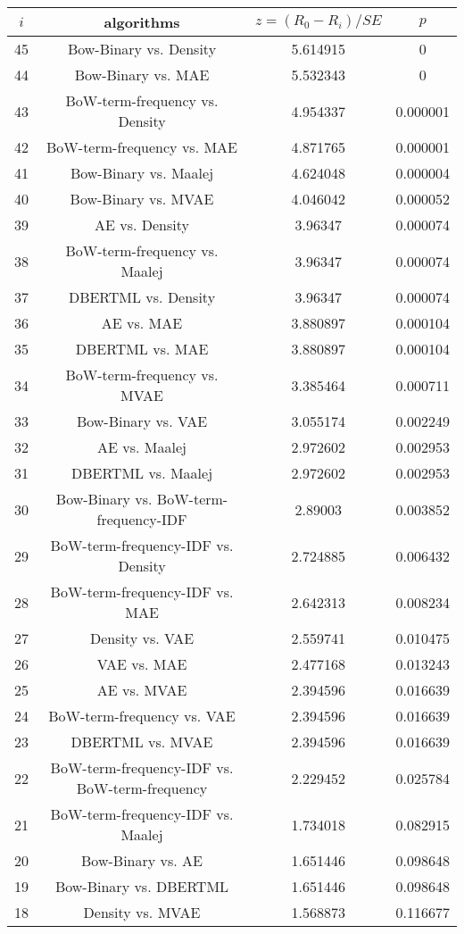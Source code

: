 \documentclass[a4paper,10pt]{article}
\begin{document}
\begin{landscape}
\begin{table}[!htp]
\centering\scriptsize
\begin{tabular}{cccc}
$i$&algorithms&$z=(R_0 - R_i)/SE$&$p$\\
\hline45&Bow-Binary vs. Density&5.614915&0\\
44&Bow-Binary vs. MAE&5.532343&0\\
43&BoW-term-frequency vs. Density&4.954337&0.000001\\
42&BoW-term-frequency vs. MAE&4.871765&0.000001\\
41&Bow-Binary vs. Maalej&4.624048&0.000004\\
40&Bow-Binary vs. MVAE&4.046042&0.000052\\
39&AE vs. Density&3.96347&0.000074\\
38&BoW-term-frequency vs. Maalej&3.96347&0.000074\\
37&DBERTML vs. Density&3.96347&0.000074\\
36&AE vs. MAE&3.880897&0.000104\\
35&DBERTML vs. MAE&3.880897&0.000104\\
34&BoW-term-frequency vs. MVAE&3.385464&0.000711\\
33&Bow-Binary vs. VAE&3.055174&0.002249\\
32&AE vs. Maalej&2.972602&0.002953\\
31&DBERTML vs. Maalej&2.972602&0.002953\\
30&Bow-Binary vs. BoW-term-frequency-IDF&2.89003&0.003852\\
29&BoW-term-frequency-IDF vs. Density&2.724885&0.006432\\
28&BoW-term-frequency-IDF vs. MAE&2.642313&0.008234\\
27&Density vs. VAE&2.559741&0.010475\\
26&VAE vs. MAE&2.477168&0.013243\\
25&AE vs. MVAE&2.394596&0.016639\\
24&BoW-term-frequency vs. VAE&2.394596&0.016639\\
23&DBERTML vs. MVAE&2.394596&0.016639\\
22&BoW-term-frequency-IDF vs. BoW-term-frequency&2.229452&0.025784\\
21&BoW-term-frequency-IDF vs. Maalej&1.734018&0.082915\\
20&Bow-Binary vs. AE&1.651446&0.098648\\
19&Bow-Binary vs. DBERTML&1.651446&0.098648\\
18&Density vs. MVAE&1.568873&0.116677\\

\end{tabular}
\end{table}
\end{landscape}
\end{document}
